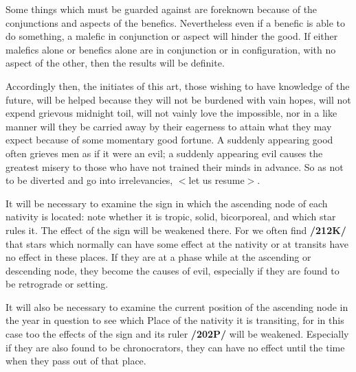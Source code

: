 Some things which must be guarded against are foreknown because of the conjunctions and aspects of the benefics. Nevertheless even if a benefic is able to do something, a malefic in conjunction or aspect will hinder the good. If either malefics alone or benefics alone are in conjunction or in configuration, with no aspect of the other, then the results will be definite. 

Accordingly then, the initiates of this art, those wishing to have knowledge of the future, will be helped because they will not be burdened with vain hopes, will not expend grievous midnight toil, will not vainly love the impossible, nor in a like manner will they be carried away by their eagerness to attain what they may expect because of some momentary good fortune. A suddenly appearing good often grieves men as if it were an evil; a suddenly appearing evil causes the greatest misery to those who have not trained their minds in advance.
So as not to be diverted and go into irrelevancies, $<$let us resume$>$. 

It will be necessary to examine the sign in which the ascending node of each nativity is located: note whether it is tropic, solid, bicorporeal, and which star rules it. The effect of the sign will be weakened there. For we often find \textbf{/212K/} that stars which normally can have some effect at the nativity or at transits have no effect in these places. If they are at a phase while at the ascending or descending node, they become the causes of evil, especially if they are found to be retrograde or setting. 

It will also be necessary to examine the current position of the ascending node in the year in question to see which Place of the nativity it is transiting, for in this case too the effects of the sign and its ruler \textbf{/202P/} will be weakened. Especially if they are also
found to be chronocrators, they can have no effect until the time when they pass out of that place.

\newpage